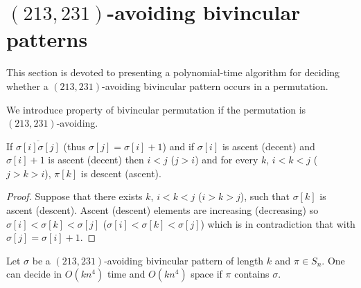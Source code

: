 \documentclass[a4paper]{llncs}
\newcommand{\pmotif}{\sigma}
\begin{document}

\section{$(213,231)$-avoiding bivincular patterns}
	\label{section:bivincular}

		This section is devoted to presenting a polynomial-time algorithm for deciding whether
	a $(213,231)$-avoiding bivincular pattern occurs in a permutation.

We introduce property of bivincular permutation if the permutation is $(213,231)$-avoiding.

\begin{lemma}
\label{lemma:ascentDescentAscent}
If $\overline{\sigma[i]\sigma[j]}$ (thus $\sigma[j]=\sigma[i]+1$) and if $\sigma[i]$ is ascent (decent) and $\sigma[i]+1$ is ascent (decent) then $i<j$ ($j>i$) and for every $k$, $i<k<j$ ($j>k>i$), $\pi[k]$ is descent (ascent).    
\end{lemma}

\begin{proof}
Suppose that there exists $k$, $i<k<j$ ($i>k>j$),
such that $\pmotif[k]$ is ascent (descent). Ascent (descent)  elements are increasing (decreasing) so $\sigma[i]<\sigma[k]<\sigma[j]$ ($\sigma[i]<\sigma[k]<\sigma[j]$) which is in contradiction that with $\sigma[j]=\sigma[i]+1$.
\end{proof}

	\begin{proposition}
		\label{Proposition:bivincular pattern}
			Let $\sigma$ be a $(213,231)$-avoiding bivincular pattern of length $k$
			and $\pi \in S_n$.
			One can decide in $O(kn^4)$ time
			and $O(kn^4)$ space if $\pi$ contains $\sigma$.
	\end{proposition}
\end{document}

